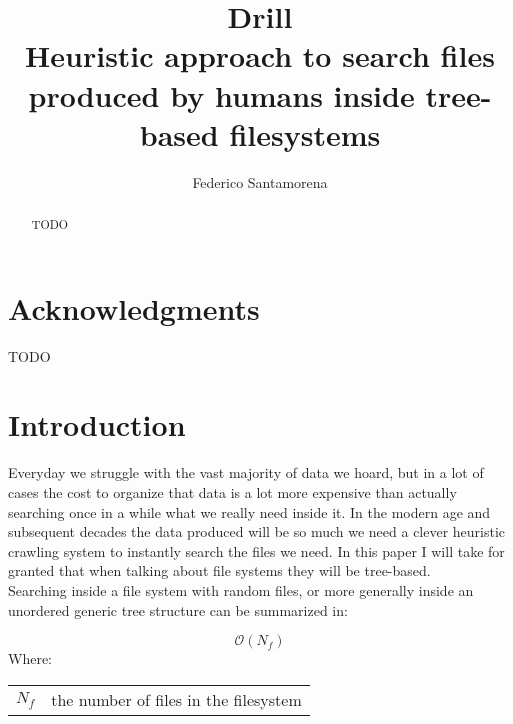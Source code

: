 \documentclass[12pt]{article}
\makeatletter
\newenvironment{conditions}
  {\par\vspace{\abovedisplayskip}\noindent\begin{tabular}{>{$}l<{$} @{${}={}$} l}}
  {\end{tabular}\par\vspace{\belowdisplayskip}}
\newcommand{\bigO}{\mathcal{O}}
\makeatother
\begin{document}
\title
{
    Drill \\
    Heuristic approach to search files produced by humans inside tree-based filesystems
}
\author
{
    Federico Santamorena
}
\maketitle



\begin{abstract}
TODO
\end{abstract}


\section{Acknowledgments}
TODO

\section{Introduction}
Everyday we struggle with the vast majority of data we hoard, but in a lot of cases the cost to organize that data is a lot more expensive than actually searching once in a while what we really need inside it.
In the modern age and subsequent decades the data produced will be so much we need a clever heuristic crawling system to instantly search the files we need.
In this paper I will take for granted that when talking about file systems they will be tree-based.\\
Searching inside a file system with random files, or more generally inside an unordered generic tree structure can be summarized in:

\begin{samepage}
\begin{equation}
    \label{equation_introduction}
    \bigO(N_f)
\end{equation}
Where:
\begin{conditions}
   N_f & the number of files in the filesystem\\
\end{conditions}
\end{samepage}
\end{document}
